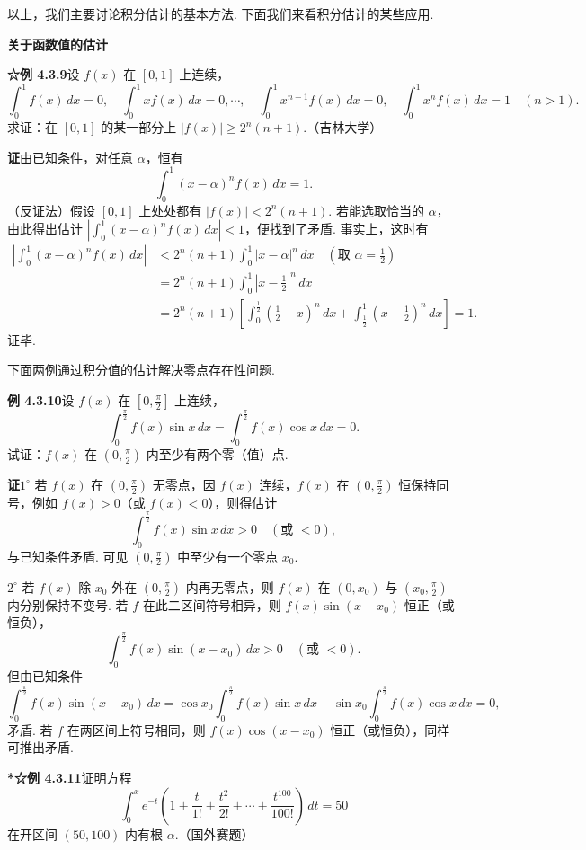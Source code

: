 \documentclass[UTF8, 12pt, fontset=fandol, oneside]{ctexart}
\begin{document}
\noindent 以上，我们主要讨论积分估计的基本方法. 下面我们来看积分估计的某些应用.

\noindent\textbf{关于函数值的估计}

\noindent\textbf{☆例 4.3.9}\quad 设 $f(x)$ 在 $[0,1]$ 上连续，
\[
\int_0^1 f(x)\,dx=0,\quad
\int_0^1 xf(x)\,dx=0,\cdots,\quad
\int_0^1 x^{n-1}f(x)\,dx=0,\quad
\int_0^1 x^n f(x)\,dx=1\quad(n>1).
\]
求证：在 $[0,1]$ 的某一部分上 $|f(x)|\ge2^n(n+1)$.（吉林大学）

\noindent\textbf{证}\quad 由已知条件，对任意 $\alpha$，恒有
\[
\int_0^1(x-\alpha)^n f(x)\,dx=1.
\tag{1}
\]
（反证法）假设 $[0,1]$ 上处处都有 $|f(x)|<2^n(n+1)$. 若能选取恰当的 $\alpha$，由此得出估计 $\left|\int_0^1(x-\alpha)^n f(x)\,dx\right|<1$，便找到了矛盾. 事实上，这时有
\[
\begin{aligned}
\left|\int_0^1(x-\alpha)^n f(x)\,dx\right|
&<2^n(n+1)\int_0^1|x-\alpha|^n\,dx\quad\left(\text{取 }\alpha=\frac12\right)\\
&=2^n(n+1)\int_0^1\left|x-\frac12\right|^n\,dx\\
&=2^n(n+1)\left[\int_0^{\frac12}\left(\frac12-x\right)^n\,dx
+\int_{\frac12}^1\left(x-\frac12\right)^n\,dx\right]=1.
\end{aligned}
\]
证毕.

\noindent 下面两例通过积分值的估计解决零点存在性问题.

\noindent\textbf{例 4.3.10}\quad 设 $f(x)$ 在 $\left[0,\frac\pi2\right]$ 上连续，
\[
\int_0^{\frac\pi2} f(x)\sin x\,dx
=\int_0^{\frac\pi2} f(x)\cos x\,dx=0.
\]
试证：$f(x)$ 在 $\left(0,\frac\pi2\right)$ 内至少有两个零（值）点.

\noindent\textbf{证}\quad $1^\circ$ 若 $f(x)$ 在 $\left(0,\frac\pi2\right)$ 无零点，因 $f(x)$ 连续，$f(x)$ 在 $\left(0,\frac\pi2\right)$ 恒保持同号，例如 $f(x)>0$（或 $f(x)<0$），则得估计
\[
\int_0^{\frac\pi2} f(x)\sin x\,dx>0\quad(\text{或 }<0),
\]
与已知条件矛盾. 可见 $\left(0,\frac\pi2\right)$ 中至少有一个零点 $x_0$.

\noindent $2^\circ$ 若 $f(x)$ 除 $x_0$ 外在 $\left(0,\frac\pi2\right)$ 内再无零点，则 $f(x)$ 在 $(0,x_0)$ 与 $\left(x_0,\frac\pi2\right)$ 内分别保持不变号. 若 $f$ 在此二区间符号相异，则 $f(x)\sin(x-x_0)$ 恒正（或恒负），
\[
\int_0^{\frac\pi2} f(x)\sin(x-x_0)\,dx>0\quad(\text{或 }<0).
\]
但由已知条件
\[
\int_0^{\frac\pi2} f(x)\sin(x-x_0)\,dx
=\cos x_0\int_0^{\frac\pi2} f(x)\sin x\,dx
-\sin x_0\int_0^{\frac\pi2} f(x)\cos x\,dx=0,
\]
矛盾. 若 $f$ 在两区间上符号相同，则 $f(x)\cos(x-x_0)$ 恒正（或恒负），同样可推出矛盾.

\noindent\textbf{*☆例 4.3.11}\quad 证明方程
\[
\int_0^x e^{-t}\left(1+\frac{t}{1!}+\frac{t^2}{2!}+\cdots+\frac{t^{100}}{100!}\right)\,dt=50
\]
在开区间 $(50,100)$ 内有根 $\alpha$.（国外赛题）
\end{document}
